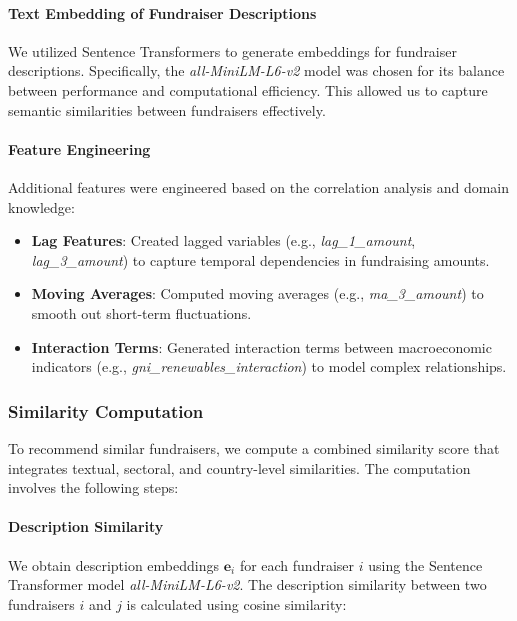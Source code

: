 \documentclass[sigconf]{acmart}
\begin{document}
\paragraph{Text Embedding of Fundraiser Descriptions}

We utilized Sentence Transformers \cite{reimers-2019-sentence-bert} to generate embeddings for fundraiser descriptions. Specifically, the \textit{all-MiniLM-L6-v2} model was chosen for its balance between performance and computational efficiency. This allowed us to capture semantic similarities between fundraisers effectively.

\paragraph{Feature Engineering}

Additional features were engineered based on the correlation analysis and domain knowledge:

\begin{itemize}
    \item \textbf{Lag Features}: Created lagged variables (e.g., \textit{lag\_1\_amount}, \textit{lag\_3\_amount}) to capture temporal dependencies in fundraising amounts.
    \item \textbf{Moving Averages}: Computed moving averages (e.g., \textit{ma\_3}\linebreak\textit{\_amount}) to smooth out short-term fluctuations.
    \item \textbf{Interaction Terms}: Generated interaction terms between macroeconomic indicators (e.g., \textit{gni\_renewables\_interaction}) to model complex relationships.
\end{itemize}

\subsubsection{Similarity Computation}

To recommend similar fundraisers, we compute a combined similarity score that integrates textual, sectoral, and country-level similarities. The computation involves the following steps:

\paragraph{Description Similarity}

We obtain description embeddings $\mathbf{e}_i$ for each fundraiser $i$ using the Sentence Transformer model \textit{all-MiniLM-L6-v2}. The description similarity between two fundraisers $i$ and $j$ is calculated using cosine similarity:
\end{document}
